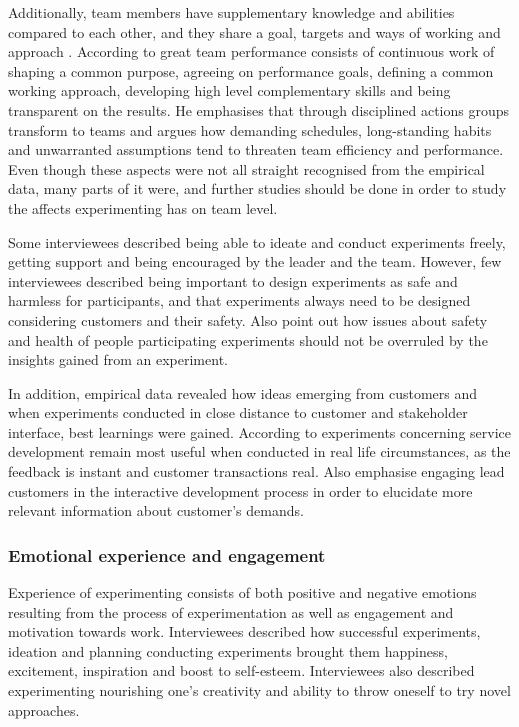 Additionally, team members have supplementary knowledge and abilities compared to each other, and they share a goal, targets and ways of working and approach \citep{edmondson1999psychological}. According to \citet{katzenbach1993wisdom} great team performance consists of continuous work of shaping a common purpose, agreeing on performance goals, defining a common working approach, developing high level complementary skills and being transparent on the results. He emphasises that through disciplined actions groups transform to teams and argues how demanding schedules, long-standing habits and unwarranted assumptions tend to threaten team efficiency and performance. Even though these aspects were not all straight recognised from the empirical data, many parts of it were, and further studies should be done in order to study the affects experimenting has on team level. 

Some interviewees described being able to ideate and conduct experiments freely, getting support and being encouraged by the leader and the team. However, few interviewees described being important to design experiments as safe and harmless for participants, and that experiments always need to be designed considering customers and their safety. Also \citep{farson2002failuretolerantleader} point out how issues about safety and health of people participating experiments should not be overruled by the insights gained from an experiment. 

In addition, empirical data revealed how ideas emerging from customers and when experiments conducted in close distance to customer and stakeholder interface, best learnings were gained. According to \citet{thomke2003r} experiments concerning service development remain most useful when conducted in real life circumstances, as the feedback is instant and customer transactions real. Also \citet{quinn1985managing} emphasise engaging lead customers in the interactive development process in order to elucidate more relevant information about customer's demands. 

\subsubsection*{Emotional experience and engagement}
Experience of experimenting consists of both positive and negative emotions resulting from the process of experimentation as well as engagement and motivation towards work. Interviewees described how successful experiments, ideation and planning conducting experiments brought them happiness, excitement, inspiration and boost to self-esteem. Interviewees also described experimenting nourishing one's creativity and ability to throw oneself to try novel approaches. 


